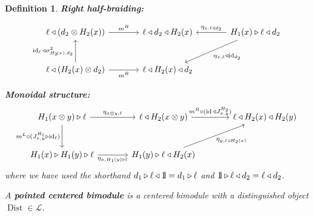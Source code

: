 \documentclass[a4paper]{article}
\numberwithin{equation}{section}
\newtheorem{definition}[counter]{Definition}
\newcommand{\idty}{{\mathrm{1}\mkern-4mu{\mathchoice{}{}{\mskip-0.5mu}{\mskip-1mu}}\mathrm{l}}}
\newcommand{\1}{{\mathrm{1}\mkern-4mu{\mathchoice{}{}{\mskip-0.5mu}{\mskip-1mu}}\mathrm{l}}}
\DeclareMathOperator{\Dist}{Dist}
\renewcommand{\L}{\mathcal{L}}
\DeclareMathOperator{\id}{id}
\begin{document}
\begin{definition}
    \noindent\textbf{Right half-braiding:}

    \begin{equation}\label{eq:right-half-braiding}
        \begin{tikzcd}[row sep=large, column sep=large]
            \ell \triangleleft (d_2 \otimes H_2(x)) \arrow[r, "m^R"] 
            & \ell \triangleleft d_2 \triangleleft H_2(x) 
            & H_1(x) \triangleright \ell \triangleleft d_2 \arrow[l, "\eta_{x,\ell\triangleleft d_2}"'] \arrow[dl, "\eta_{x,\ell} \triangleleft \id_{d_2}"] \\
            \ell \triangleleft (H_2(x) \otimes d_2) \arrow[u, "\id_\ell \triangleleft \sigma^2_{H_2\!(x),d_2}"] \arrow[r, "m^R"'] 
            & \ell \triangleleft H_2(x) \triangleleft d_2 
            &
        \end{tikzcd}
    \end{equation}

    \noindent\textbf{Monoidal structure:}
    \begin{equation}\label{eq:monoidal-structure-centered-bimodule}
            \begin{tikzcd}[row sep=large, column sep=large]
                H_1(x\otimes y) \triangleright \ell 
                \arrow[r, "\eta_{x\otimes y,\ell}"] 
                \arrow[d, "m^L\circ(J^{H_1}_{x,y}\triangleright\id_\ell)"'] 
                & \ell \triangleleft H_2(x\otimes y) 
                \arrow[r, "m^R\circ(\id\triangleleft J^{H_2}_{x,y})"] 
                & \ell \triangleleft H_2(x) \triangleleft H_2(y) \\
                H_1(x) \triangleright H_1(y) \triangleright \ell 
                \arrow[r, "\eta_{x,H_1(y)\triangleright\ell}"'] 
                & H_1(y) \triangleright \ell \triangleleft H_2(x) 
                \arrow[ru, "\eta_{y,\ell\triangleleft H_2(x)}"'] 
                  & 
        \end{tikzcd}
    \end{equation}
    where we have used the shorthand $d_1 \triangleright \ell \triangleleft \idty = d_1 \triangleright \ell$ and $\idty \triangleright \ell \triangleleft d_2 = \ell \triangleleft d_2$.
    
    A \emph{\bf pointed centered bimodule} is a centered bimodule with a distinguished object $\Dist \in \L$.
\end{definition}
\end{document}
